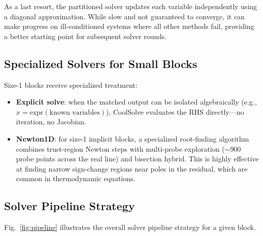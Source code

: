 \documentclass[review,3p]{elsarticle}
\begin{document}
As a last resort, the partitioned solver updates each variable independently using a diagonal approximation. While slow and not guaranteed to converge, it can make progress on ill-conditioned systems where all other methods fail, providing a better starting point for subsequent solver rounds.

\subsection{Specialized Solvers for Small Blocks}

Size-1 blocks receive specialized treatment:
\begin{itemize}
    \item \textbf{Explicit solve}: when the matched output can be isolated algebraically (e.g., $x = \text{expr}(\text{known variables})$), CoolSolve evaluates the RHS directly---no iteration, no Jacobian.
    \item \textbf{Newton1D}: for size-1 implicit blocks, a specialized root-finding algorithm combines trust-region Newton steps with multi-probe exploration (${\sim}900$ probe points across the real line) and bisection hybrid. This is highly effective at finding narrow sign-change regions near poles in the residual, which are common in thermodynamic equations.
\end{itemize}

\subsection{Solver Pipeline Strategy}

Fig.~\ref{fig:pipeline} illustrates the overall solver pipeline strategy for a given block.
\end{document}
